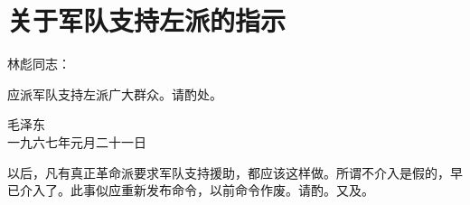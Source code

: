 \section[关于军队支持左派的指示（一九六七年一月二十一日）]{关于军队支持左派的指示}


林彪同志：

应派军队支持左派广大群众。请酌处。
{\raggedleft 毛泽东\\一九六七年元月二十一日\par}

以后，凡有真正革命派要求军队支持援助，都应该这样做。所谓不介入是假的，早已介入了。此事似应重新发布命令，以前命令作废。请酌。又及。


